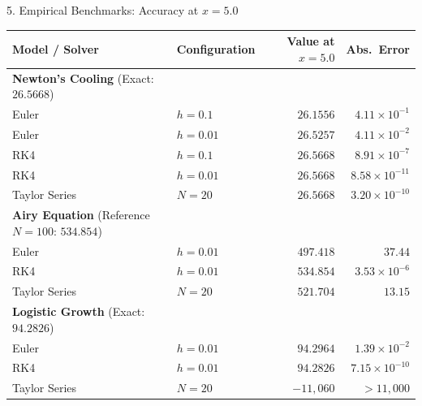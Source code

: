 \documentclass[aspectratio=169]{beamer}
\begin{document}
\begin{frame}{5. Empirical Benchmarks: Accuracy at $x = 5.0$}
  \centering
  \scriptsize
  \setlength{\tabcolsep}{6pt}
  \renewcommand{\arraystretch}{1.1}
  \begin{tabular}{llrr}
    \toprule
    \textbf{Model / Solver} & \textbf{Configuration} & \textbf{Value at $x=5.0$} & \textbf{Abs.\ Error}\\
    \midrule
    \textbf{Newton's Cooling} (Exact: $26.5668$) & & & \\
    \quad Euler & $h=0.1$  & $26.1556$ & $4.11\times10^{-1}$ \\
    \quad Euler & $h=0.01$ & $26.5257$ & $4.11\times10^{-2}$ \\
    \quad RK4   & $h=0.1$  & $26.5668$ & $8.91\times10^{-7}$ \\
    \quad RK4   & $h=0.01$ & $26.5668$ & $8.58\times10^{-11}$ \\
    \quad Taylor Series & $N=20$ & $26.5668$ & $3.20\times10^{-10}$ \\
    \midrule
    \textbf{Airy Equation} (Reference $N=100$: $534.854$) & & & \\
    \quad Euler & $h=0.01$ & $497.418$ & $37.44$ \\
    \quad RK4   & $h=0.01$ & $534.854$ & $3.53\times10^{-6}$ \\
    \quad Taylor Series & $N=20$ & $521.704$ & $13.15$ \\
    \midrule
    \textbf{Logistic Growth} (Exact: $94.2826$) & & & \\
    \quad Euler & $h=0.01$ & $94.2964$ & $1.39\times10^{-2}$ \\
    \quad RK4   & $h=0.01$ & $94.2826$ & $7.15\times10^{-10}$ \\
    \quad Taylor Series & $N=20$ & \color{danger}$-11{,}060$ & \color{danger}$>11{,}000$ \\
    \bottomrule
  \end{tabular}
  \vskip4pt
\end{frame}
\end{document}
